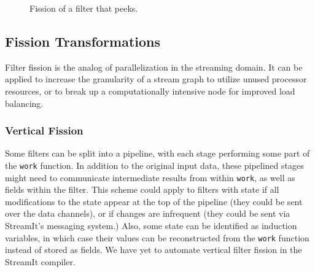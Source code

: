 \begin{figure}
\centering
\subfigure{\label{fig:fission-peek-a}}
\subfigure{\label{fig:fission-peek-b}}
\caption{\protect\small Fission of a filter that peeks.  
\protect\label{fig:fission-peek}}
\end{figure}

\subsection{Fission Transformations}

Filter fission is the analog of parallelization in the streaming
domain.  It can be applied to increase the granularity of a stream
graph to utilize unused processor resources, or to break up a
computationally intensive node for improved load balancing.

\subsubsection{Vertical Fission}

Some filters can be split into a pipeline, with each stage performing
some part of the {\tt work} function.  In addition to the original
input data, these pipelined stages might need to communicate
intermediate results from within {\tt work}, as well as fields within
the filter.  This scheme could apply to filters with state if all
modifications to the state appear at the top of the pipeline (they
could be sent over the data channels), or if changes are infrequent
(they could be sent via StreamIt's messaging system.)  Also, some
state can be identified as induction variables, in which case their
values can be reconstructed from the {\tt work} function instead of
stored as fields.  We have yet to automate vertical filter fission in
the StreamIt compiler.


